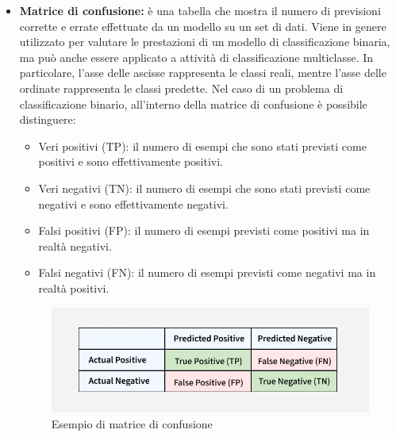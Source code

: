 \documentclass[12pt]{article}
\begin{document}
\begin{itemize}
    \item \textbf{Matrice di confusione:} è una tabella che mostra il numero di previsioni corrette e errate effettuate da un modello su un set di dati. Viene in genere utilizzato per valutare le prestazioni di un modello di classificazione binaria, ma può anche essere applicato a attività di classificazione multiclasse. In particolare, l’asse delle ascisse rappresenta le classi reali, mentre l’asse delle ordinate rappresenta le classi predette.
    Nel caso di un problema di classificazione binario, all’interno della matrice di confusione è possibile distinguere:
    \begin{itemize}
        \item Veri positivi (TP): il numero di esempi che sono stati previsti come positivi e sono effettivamente positivi.
        \item Veri negativi (TN): il numero di esempi che sono stati previsti come negativi e sono effettivamente negativi.
        \item Falsi positivi (FP): il numero di esempi previsti come positivi ma in realtà negativi.
        \item Falsi negativi (FN): il numero di esempi previsti come negativi ma in realtà positivi.
    \end{itemize}

\begin{figure}[H]
    \centering
    \includegraphics[width=1.00\textwidth]{./img/predicted_condition_2_.png}
    \caption{Esempio di matrice di confusione}
    \label{fig:confusion-matrix-example}
\end{figure}


\end{itemize}
\end{document}

